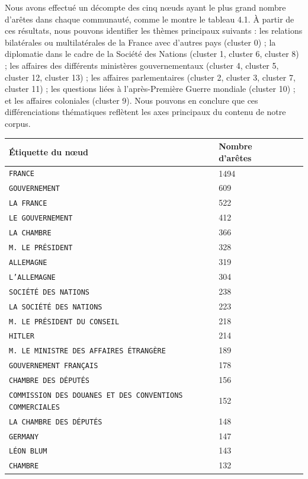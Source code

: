 \documentclass[a4paper,twoside,12pt]{book}
\begin{document}
Nous avons effectué un décompte des cinq nœuds ayant le plus grand nombre d'arêtes dans chaque communauté, comme le montre le tableau 4.1. À partir de ces résultats, nous pouvons identifier les thèmes principaux suivants : les relations bilatérales ou multilatérales de la France avec d'autres pays (cluster 0) ; la diplomatie dans le cadre de la Société des Nations (cluster 1, cluster 6, cluster 8) ; les affaires des différents ministères gouvernementaux (cluster 4, cluster 5, cluster 12, cluster 13) ; les affaires parlementaires (cluster 2, cluster 3, cluster 7, cluster 11) ; les questions liées à l'après-Première Guerre mondiale (cluster 10) ; et les affaires coloniales (cluster 9). Nous pouvons en conclure que ces différenciations thématiques reflètent les axes principaux du contenu de notre corpus.

\begin{table}[ht]
\centering
\begin{tabular}{ll@{\hskip 1cm}ll}
\hline
\textbf{Étiquette du nœud} & \textbf{Nombre d'arêtes}  \\
\hline
\texttt{FRANCE} & 1494 \\
\texttt{GOUVERNEMENT} & 609 \\
\texttt{LA FRANCE} & 522 \\
\texttt{LE GOUVERNEMENT} & 412 \\
\texttt{LA CHAMBRE} & 366 \\
\texttt{M. LE PRÉSIDENT} & 328 \\
\texttt{ALLEMAGNE} & 319 \\
\texttt{L'ALLEMAGNE} & 304 \\
\texttt{SOCIÉTÉ DES NATIONS} & 238 \\
\texttt{LA SOCIÉTÉ DES NATIONS} & 223 \\
\texttt{M. LE PRÉSIDENT DU CONSEIL} & 218 \\
\texttt{HITLER} & 214 \\
\texttt{M. LE MINISTRE DES AFFAIRES ÉTRANGÈRE} & 189 \\
\texttt{GOUVERNEMENT FRANÇAIS} & 178 \\
\texttt{CHAMBRE DES DÉPUTÉS} & 156 \\
\texttt{COMMISSION DES DOUANES ET DES CONVENTIONS COMMERCIALES} & 152 \\
\texttt{LA CHAMBRE DES DÉPUTÉS} & 148 \\
\texttt{GERMANY} & 147 \\
\texttt{LÉON BLUM} & 143 \\
\texttt{CHAMBRE} & 132 \\

\end{tabular}
\end{table}
\end{document}
